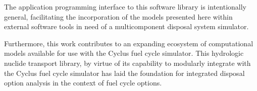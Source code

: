 The application programming interface to this software library is intentionally
general, facilitating the incorporation of the models presented here within
external software tools in need of a multicomponent disposal system simulator.  

Furthermore, this work contributes to an expanding ecosystem of computational
models available for use with the Cyclus fuel cycle simulator. This hydrologic
nuclide transport library, by virtue of its capability to modularly integrate
with the Cyclus fuel cycle simulator has laid the foundation for integrated
disposal option analysis in the context of fuel cycle options.
